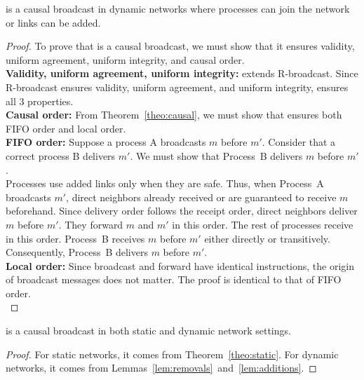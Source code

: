\begin{lemma}
  \CBROADCAST is a causal broadcast in dynamic networks where processes can join
  the network or links can be added.
\end{lemma}

\begin{proof}
  To prove that \CBROADCAST is a causal broadcast, we must show that it ensures
  validity, uniform agreement, uniform integrity, and causal order. \\
  \textbf{Validity, uniform agreement, uniform integrity:} \CBROADCAST extends
  R-broadcast. Since R-broadcast ensures validity, uniform agreement, and
  uniform
  integrity, \CBROADCAST ensures all 3 properties. \\
  \textbf{Causal order:} From Theorem~\ref{theo:causal}, we must show
  that \CBROADCAST ensures both FIFO order and local order. \\
  \textbf{FIFO order:} Suppose a process A broadcasts $m$ before $m'$. Consider
  that a correct process B delivers $m'$. We must show that Process~B
  delivers $m$ before $m'$. \\
  Processes use added links only when they are safe. Thus, when Process~A
  broadcasts $m'$, direct neighbors already received or are guaranteed to
  receive $m$ beforehand. Since delivery order follows the receipt order, direct
  neighbors deliver $m$ before $m'$. They forward $m$ and $m'$ in this
  order. The rest of processes receive in this order. Process~B receives $m$
  before $m'$ either directly or transitively. Consequently, Process~B delivers
  $m$ before $m'$. \\
  \textbf{Local order:} Since broadcast and forward have identical instructions,
  the origin of broadcast messages does not matter. The proof is identical to
  that of FIFO order. \\
\end{proof}

\begin{theorem}
  \CBROADCAST is a causal broadcast in both static and dynamic network settings.
\end{theorem}

\begin{proof}
  For static networks, it comes from Theorem~\ref{theo:static}. For dynamic
  networks, it comes from Lemmas~\ref{lem:removals}~and~\ref{lem:additions}.
\end{proof}

